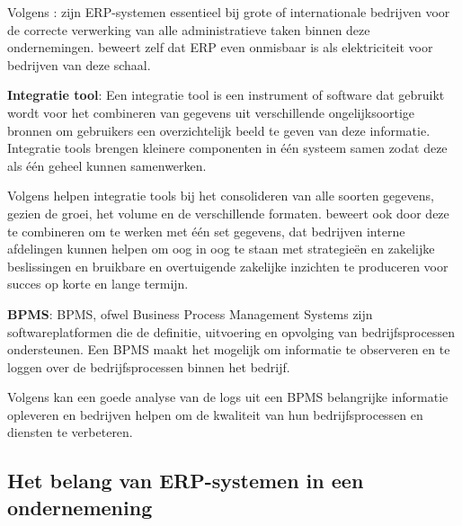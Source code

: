 \vspace{\baselineskip}

Volgens \textcite{Oracle2017}: zijn ERP-systemen essentieel bij grote of internationale bedrijven voor de correcte verwerking van alle administratieve taken binnen deze ondernemingen. \textcite{Oracle2017} beweert zelf dat ERP even onmisbaar is als elektriciteit voor bedrijven van deze schaal.

\vspace{\baselineskip}

\textbf{Integratie tool}: Een integratie tool is een instrument of software dat gebruikt wordt voor het combineren van gegevens uit verschillende ongelijksoortige bronnen om gebruikers een overzichtelijk beeld te geven van deze informatie. Integratie tools brengen kleinere componenten in één systeem samen zodat deze als één geheel kunnen samenwerken. \autocite{Microsoft2024}

\vspace{\baselineskip}

Volgens \textcite{Microsoft2024} helpen integratie tools bij het consolideren van alle soorten gegevens, gezien de groei, het volume en de verschillende formaten. \textcite{Microsoft2024} beweert ook door deze te combineren om te werken met één set gegevens, dat bedrijven interne afdelingen kunnen helpen om oog in oog te staan met strategieën en zakelijke beslissingen en bruikbare en overtuigende zakelijke inzichten te produceren voor succes op korte en lange termijn.

\vspace{\baselineskip}

\textbf{BPMS}: BPMS, ofwel Business Process Management Systems zijn softwareplatformen die de definitie, uitvoering en opvolging van bedrijfsprocessen ondersteunen. Een BPMS maakt het mogelijk om informatie te observeren en te loggen over de bedrijfsprocessen binnen het bedrijf. \autocite{grigori2004business}

\vspace{\baselineskip}

Volgens \textcite{grigori2004business} kan een goede analyse van de logs uit een BPMS belangrijke informatie opleveren en bedrijven helpen om de kwaliteit van hun bedrijfsprocessen en diensten te verbeteren.




\subsection{Het belang van ERP-systemen in een ondernemening}
\label{sec:Het belang van ERP-systemen in een ondernemeningBP}

